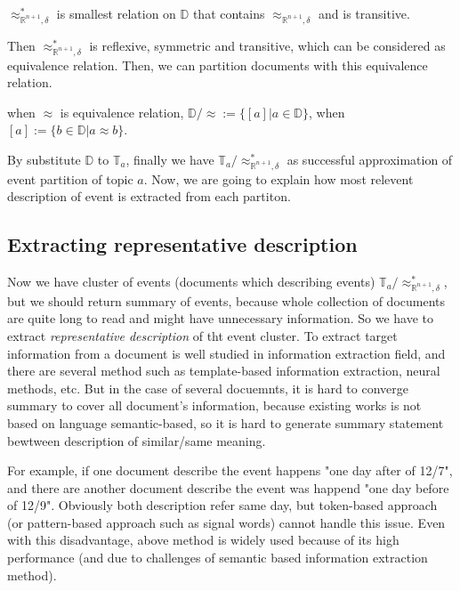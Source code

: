 \begin{definition}
    $\approx_{\mathbb{R}^{n+1}, \delta}^{*}$ is smallest relation on $\mathbb{D}$ that contains $\approx_{\mathbb{R}^{n+1}, \delta}$ and is transitive.
\end{definition}

Then $\approx_{\mathbb{R}^{n+1}, \delta}^{*}$ is reflexive, symmetric and transitive, which can be considered as equivalence relation.
Then, we can partition documents with this equivalence relation.

\begin{definition}
    when $\approx$ is equivalence relation, $\mathbb{D}/\approx := \{[a] | a \in \mathbb{D}\}$, when $[a] := \{b \in \mathbb{D} | a \approx b \}$.
\end{definition}

By substitute $\mathbb{D}$ to $\mathbb{T}_{a}$, finally we have $\mathbb{T}_{a}/\approx_{\mathbb{R}^{n+1}, \delta}^{*}$ as successful approximation 
of event partition of topic $a$. Now, we are going to explain how most relevent description of event is extracted from each partiton.

\subsection{Extracting representative description}

Now we have cluster of events (documents which describing events) $\mathbb{T}_{a}/\approx_{\mathbb{R}^{n+1}, \delta}^{*}$, but we should
return summary of events, because whole collection of documents are quite long to read and might have
unnecessary information. So we have to extract \textit{representative description} of tht event cluster.
To extract target information from a document is well studied in information extraction field,
and there are several method such as template-based information extraction, neural methods, etc.
But in the case of several docuemnts, it is hard to converge summary to cover all document's information,
because existing works is not based on language semantic-based, so it is hard to generate summary statement
bewtween description of similar/same meaning. 

For example, if one document describe the event happens "one day after of 12/7", and there are another
document describe the event was happend "one day before of 12/9". Obviously both description
refer same day, but token-based approach (or pattern-based approach such as signal words) cannot
handle this issue. Even with this disadvantage, above method is widely used because of
its high performance (and due to challenges of semantic based information extraction method).

